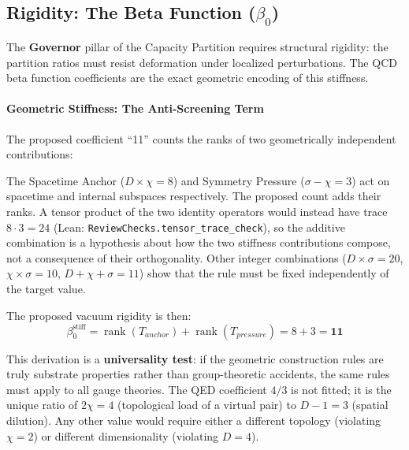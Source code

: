 
\subsection{Rigidity: The Beta Function (\texorpdfstring{$\beta_0$}{beta\_0})}

The \textbf{Governor} pillar of the Capacity Partition requires structural rigidity: the partition ratios must resist deformation under localized perturbations. The QCD beta function coefficients are the exact geometric encoding of this stiffness.

\paragraph{Geometric Stiffness: The Anti-Screening Term}
The proposed coefficient ``11'' counts the ranks of two geometrically independent contributions:

The Spacetime Anchor ($D \times \chi = 8$) and Symmetry Pressure ($\sigma - \chi = 3$) act on spacetime and internal subspaces respectively. The proposed count adds their ranks. A tensor product of the two identity operators would instead have trace $8\cdot3=24$ (Lean: \texttt{ReviewChecks.tensor\_trace\_check}), so the additive combination is a hypothesis about how the two stiffness contributions compose, not a consequence of their orthogonality. Other integer combinations ($D\times\sigma=20$, $\chi\times\sigma=10$, $D+\chi+\sigma=11$) show that the rule must be fixed independently of the target value.

The proposed vacuum rigidity is then:
\begin{equation}
    \beta_0^{\text{stiff}} = \operatorname{rank}(T_{anchor}) + \operatorname{rank}(T_{pressure}) = 8 + 3 = \mathbf{11}
\end{equation}

This derivation is a \textbf{universality test}: if the geometric construction rules are truly substrate properties rather than group-theoretic accidents, the same rules must apply to all gauge theories. The QED coefficient $4/3$ is not fitted; it is the unique ratio of $2\chi = 4$ (topological load of a virtual pair) to $D-1 = 3$ (spatial dilution). Any other value would require either a different topology (violating $\chi=2$) or different dimensionality (violating $D=4$).

